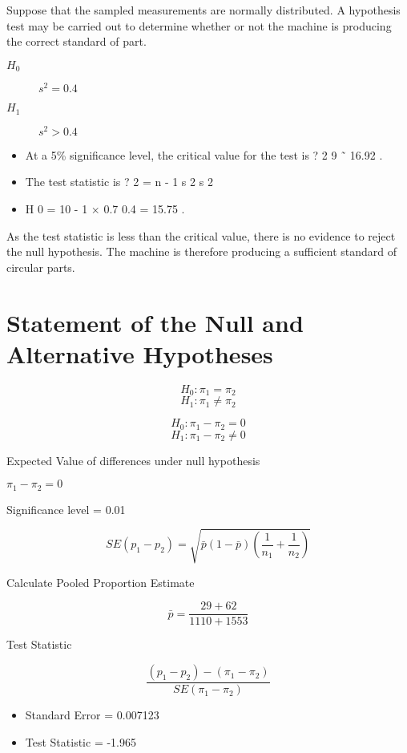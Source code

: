 	Suppose that the sampled measurements are normally distributed. A hypothesis test may be carried out to determine whether or not the machine is producing the correct standard of part.
	
	\begin{description}
		\item[$H_0$] $s^2=0.4$
		\item[$H_1$] $s^2>0.4$
	\end{description} 
	
	\begin{itemize}
		\item At a 5\% significance level, the critical value for the test is ? 2 9 ˜ 16.92 . 
		\item The test statistic is ? 2 = n - 1 s 2 s 2 
		\item H 0 = 10 - 1 × 0.7 0.4 = 15.75 .
	\end{itemize}
	
	
	
	
	As the test statistic is less than the critical value, there is no evidence to reject the null hypothesis. The machine is therefore producing a sufficient standard of circular parts.
	


\section{Statement of the Null and Alternative Hypotheses}
\[H_0 : \pi_1 = \pi_2\]
\[H_1 : \pi_1 \neq \pi_2\]

\[H_0 : \pi_1 - \pi_2 = 0\]
\[H_1 : \pi_1 -  \pi_2 \neq 0\]

Expected Value of differences under null hypothesis

$\pi_1 - \pi_2 = 0$


Significance level = 0.01

\[SE(p_1 - p_2) = \sqrt{\bar{p}(1-\bar{p})\left( \frac{1}{n_1} + \frac{1}{n_2} \right)  }\]

Calculate Pooled Proportion Estimate

\[ \bar{p} = \frac{29 + 62}{1110 + 1553} \]

Test Statistic

\[ \frac{(p_1 - p_2) - (\pi_1 - \pi_2)}{SE(\pi_1 - \pi_2)} \]


\begin{itemize}
	\item Standard Error = 0.007123
	\item Test Statistic = -1.965
\end{itemize}





